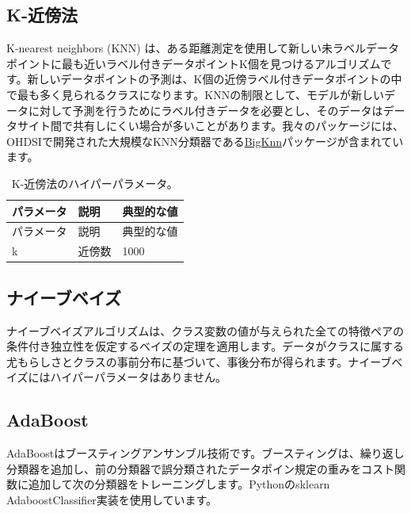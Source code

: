 \documentclass[
  11pt]{book}
\theoremstyle{definition}
\theoremstyle{definition}
\theoremstyle{definition}
\theoremstyle{definition}
\theoremstyle{remark}
\begin{document}
\subsection{K-近傍法}\label{k-ux8fd1ux508dux6cd5}

K-nearest neighbors (KNN) は、ある距離測定を使用して新しい未ラベルデータポイントに最も近いラベル付きデータポイントK個を見つけるアルゴリズムです。新しいデータポイントの予測は、K個の近傍ラベル付きデータポイントの中で最も多く見られるクラスになります。KNNの制限として、モデルが新しいデータに対して予測を行うためにラベル付きデータを必要とし、そのデータはデータサイト間で共有しにくい場合が多いことがあります。我々のパッケージには、OHDSIで開発された大規模なKNN分類器である\href{https://github.com/OHDSI/BigKnn}{BigKnn}パッケージが含まれています。  

\begin{longtable}[]{@{}lll@{}}
\caption{\label{tab:knnParameters} K-近傍法のハイパーパラメータ。}\tabularnewline
\toprule\noalign{}
パラメータ & 説明 & 典型的な値 \\
\midrule\noalign{}
\endfirsthead
\toprule\noalign{}
パラメータ & 説明 & 典型的な値 \\
\midrule\noalign{}
\endhead
\bottomrule\noalign{}
\endlastfoot
k & 近傍数 & 1000 \\
\end{longtable}

\subsection{ナイーブベイズ}\label{ux30caux30a4ux30fcux30d6ux30d9ux30a4ux30ba}

ナイーブベイズアルゴリズムは、クラス変数の値が与えられた全ての特徴ペアの条件付き独立性を仮定するベイズの定理を適用します。データがクラスに属する尤もらしさとクラスの事前分布に基づいて、事後分布が得られます。ナイーブベイズにはハイパーパラメータはありません。 

\subsection{AdaBoost}\label{adaboost}

AdaBoostはブースティングアンサンブル技術です。ブースティングは、繰り返し分類器を追加し、前の分類器で誤分類されたデータポイン規定の重みをコスト関数に追加して次の分類器をトレーニングします。Pythonのsklearn AdaboostClassifier実装を使用しています。  
\end{document}
